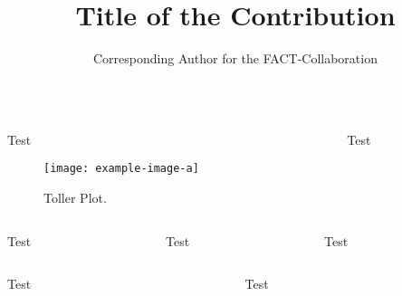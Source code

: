 \documentclass[t]{beamer}
\title{Title of the Contribution}
\author{Corresponding Author for the FACT-Collaboration}
\newlength{\thirdtextwidth}
\begin{document}
%
\begin{columns}[onlytextwidth]%
  \begin{column}{0.5\textwidth}%
    \begin{block}[equal height group=A]{Test}%
      \begin{multicols}{2}
        \begin{figure}
          \texttt{[image: example-image-a]}\\
          \caption{Toller Plot.\cite{icrc-alignment}}\label{fig:tollerplot}
        \end{figure}
        \columnbreak
        \blindtext\cite{icrc-muons}
      \end{multicols}
    \end{block}%
  \end{column}%
  \begin{column}{0.5\textwidth}%
    \begin{alertblock}[equal height group=A]{Test}%
      \begin{multicols}{2}
        \blindtext\cite{fact-reference}
        \blindtext 
      \end{multicols}
    \end{alertblock}%
  \end{column}%
\end{columns}%
\begin{columns}[c, onlytextwidth]%
  \begin{column}{\thirdtextwidth}%
    \begin{exampleblock}{Test}%
      \blindtext%
    \end{exampleblock}%
  \end{column}%
  \begin{column}{\thirdtextwidth}%
    \begin{block}{Test}%
      \blindtext%
    \end{block}%
  \end{column}%
  \begin{column}{\thirdtextwidth}%
    \begin{block}{Test}%
      \blindtext%
    \end{block}%
  \end{column}%
\end{columns}%
\begin{columns}[onlytextwidth]%
  \begin{column}{0.5\textwidth}%
    \begin{block}{Test}%
      \blindtext%
    \end{block}%
  \end{column}%
  \begin{column}{0.5\textwidth}%
    \begin{block}{Test}%
      \blindtext%
    \end{block}%
  \end{column}%
\end{columns}%
\end{document}
